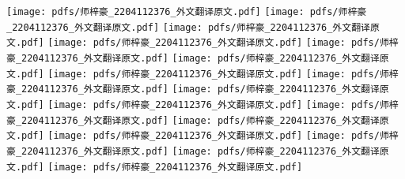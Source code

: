 

\setcounter{page}{36}
{\centering
\vspace{-5ex}
\texttt{[image: pdfs/师梓豪\_2204112376\_外文翻译原文.pdf]}
\texttt{[image: pdfs/师梓豪\_2204112376\_外文翻译原文.pdf]}
\texttt{[image: pdfs/师梓豪\_2204112376\_外文翻译原文.pdf]}
\texttt{[image: pdfs/师梓豪\_2204112376\_外文翻译原文.pdf]}
\texttt{[image: pdfs/师梓豪\_2204112376\_外文翻译原文.pdf]}
\texttt{[image: pdfs/师梓豪\_2204112376\_外文翻译原文.pdf]}
\texttt{[image: pdfs/师梓豪\_2204112376\_外文翻译原文.pdf]}
\texttt{[image: pdfs/师梓豪\_2204112376\_外文翻译原文.pdf]}
\texttt{[image: pdfs/师梓豪\_2204112376\_外文翻译原文.pdf]}
\texttt{[image: pdfs/师梓豪\_2204112376\_外文翻译原文.pdf]}
\texttt{[image: pdfs/师梓豪\_2204112376\_外文翻译原文.pdf]}
\texttt{[image: pdfs/师梓豪\_2204112376\_外文翻译原文.pdf]}
\texttt{[image: pdfs/师梓豪\_2204112376\_外文翻译原文.pdf]}
\texttt{[image: pdfs/师梓豪\_2204112376\_外文翻译原文.pdf]}
\texttt{[image: pdfs/师梓豪\_2204112376\_外文翻译原文.pdf]}
\texttt{[image: pdfs/师梓豪\_2204112376\_外文翻译原文.pdf]}
}
